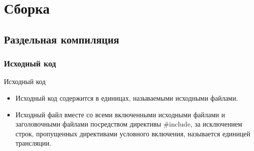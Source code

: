


    
    \section{Сборка}
    \subsection{Раздельная компиляция}
    \subsubsection{Исходный код}
    \begin{frame}{Исходный код}
        \begin{itemize}
            \item Исходный код содержится в единицах, называемыми исходными файлами.
            \item Исходный файл вместе со всеми включенными исходными файлами и заголовочными файлами посредством директивы \#include,
                за исключением строк, пропущенных директивами условного включения, называется единицей трансляции.
        \end{itemize}
    \end{frame}
